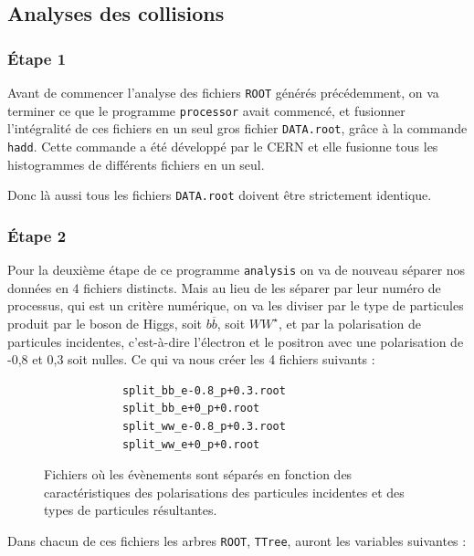 \documentclass[10pt,a4paper]{report}
\newcommand{\cad}{c'est-à-dire\xspace}
\newcommand{\ROOT}{\texttt{ROOT}\xspace}
\newcommand{\processor}{\texttt{processor}\xspace}
\newcommand{\analysis}{\texttt{analysis}\xspace}
\newcommand{\bbar}{\overline{b}}
\newcommand{\Wstar}{W^{\star}}
\begin{document}
\subsection{Analyses des collisions}

\subsubsection{Étape 1}

Avant de commencer l'analyse des fichiers \ROOT générés précédemment, on va terminer ce que le programme \processor avait commencé, et fusionner l'intégralité de ces fichiers en un seul gros fichier \texttt{DATA.root}, grâce à la commande \texttt{hadd}. 
Cette commande a été développé par le CERN et elle fusionne tous les histogrammes de différents fichiers en un seul. 

Donc là aussi tous les fichiers \texttt{DATA.root} doivent être strictement identique.

\subsubsection{Étape 2}

Pour la deuxième étape de ce programme \analysis on va de nouveau séparer nos données en 4 fichiers distincts. 
Mais au lieu de les séparer par leur numéro de processus, qui est un critère numérique, on va les diviser par le type de particules produit par le boson de Higgs, soit $b\bbar$, soit $W\Wstar$, et par la polarisation de particules incidentes, \cad l'électron et le positron avec une polarisation de -0,8 et 0,3 soit nulles.
Ce qui va nous créer les 4 fichiers suivants :

\begin{figure}[h!]
	\centering
	\begin{lstlisting}
			split_bb_e-0.8_p+0.3.root
			split_bb_e+0_p+0.root
			split_ww_e-0.8_p+0.3.root
			split_ww_e+0_p+0.root
	\end{lstlisting}
	\label{files:split}
	\caption{Fichiers où les évènements sont séparés en fonction des caractéristiques des polarisations des particules incidentes et des types de particules résultantes.}
\end{figure}

Dans chacun de ces fichiers les arbres \ROOT, \texttt{TTree}, auront les variables suivantes :
\end{document}
